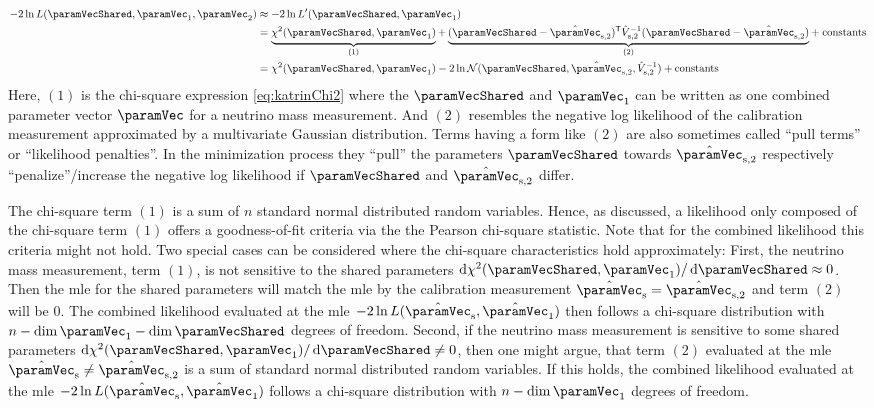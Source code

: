 \begin{equation}
\begin{split}
\label{eq:penalizedLikelihood}
-2\ln L(\paramVecShared, \paramVec_1, \paramVec_2) &\approx
-2\ln L^\prime(\paramVecShared, \paramVec_1) \\ &=
\underbrace{
	\chi^2(\paramVecShared, \paramVec_1)
	\vphantom{(\paramVecShared - \hat{\paramVec}_\mathrm{s,2})^{\mathsf{T}}}
}_{(1)}
+
\underbrace{
	(\paramVecShared - \hat{\paramVec}_\mathrm{s,2})^{\mathsf{T}}
	\hat{V}_\mathrm{s,2}^{-1}
	(\paramVecShared - \hat{\paramVec}_\mathrm{s,2})
}_{(2)} +\; 
\mathrm{ constants}\\ &=
\chi^2(\paramVecShared, \paramVec_1) 
-2\ln \mathcal{N}(\paramVecShared, \hat{\paramVec}_\mathrm{s,2}, \hat{V}_\mathrm{s,2}^{-1}) +
\mathrm{ constants}
\end{split}
\end{equation}
Here, $(1)$ is the chi-square expression \eqref{eq:katrinChi2} where the $\paramVecShared$ and $\paramVec_1$ can be written as one combined parameter vector $\paramVec$ for a neutrino mass measurement. And $(2)$ resembles the negative log likelihood of the calibration measurement approximated by a multivariate Gaussian distribution. Terms having a form like $(2)$ are also sometimes called ``pull terms'' or ``likelihood penalties''. In the minimization process they ``pull'' the parameters $\paramVecShared$ towards $\hat{\paramVec}_\mathrm{s,2}$ respectively ``penalize''/increase the negative log likelihood if $\paramVecShared$ and $\hat{\paramVec}_\mathrm{s,2}$ differ.


\newcommand{\CombLmax}{-2\ln L(\hat{\paramVec}_\mathrm{s}, \hat{\paramVec}_1)}
The chi-square term $(1)$ is a sum of $n$ standard normal distributed random variables. Hence, as discussed, a likelihood only composed of the chi-square term $(1)$ offers a goodness-of-fit criteria via the the Pearson chi-square statistic. Note that for the combined likelihood this criteria might not hold. Two special cases can be considered where the chi-square characteristics hold approximately: First, the neutrino mass measurement, term $(1)$, is not sensitive to the shared parameters $\d \chi^2(\paramVecShared, \paramVec_1) /\d \paramVecShared \approx 0$. Then the \gls{mle} for the shared parameters will match the \gls{mle} by the calibration measurement $\hat{\paramVec}_\mathrm{s} = \hat{\paramVec}_{\mathrm{s},2}$ and term $(2)$ will be 0. The combined likelihood evaluated at the \gls{mle} $\CombLmax$ then follows a chi-square distribution with $n-\dim\paramVec_1-\dim\paramVecShared$ degrees of freedom. Second, if the neutrino mass measurement is sensitive to some shared parameters $\d \chi^2(\paramVecShared, \paramVec_1) /\d \paramVecShared \neq 0$, then one might argue, that term $(2)$ evaluated at the \gls{mle} $\hat{\paramVec}_\mathrm{s} \neq \hat{\paramVec}_{\mathrm{s},2}$ is a sum of standard normal distributed random variables. If this holds, the combined likelihood evaluated at the \gls{mle} $\CombLmax$ follows a chi-square distribution with $n-\dim\paramVec_1$ degrees of freedom.


